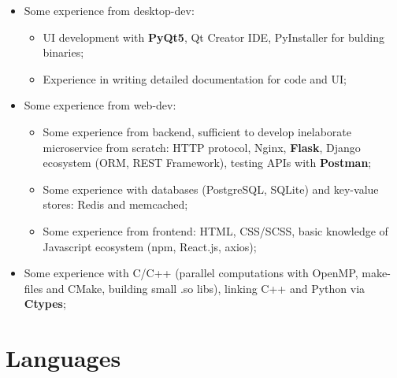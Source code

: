 \documentclass[12pt,a4paper]{moderncv}
\begin{document}
{\begin{itemize}
\begin{itemize}
        gradient boosting with \textbf{CatBoost}; experience with Torch framework; \newline
        \item Advanced work with \textbf{LaTeX} for scientific texts and presentations; \newline
    \end{itemize} 
 \item Some experience from desktop-dev:\newline
    \begin{itemize}
        \item UI development with \textbf{PyQt5}, Qt Creator IDE, PyInstaller for bulding binaries; \newline
        \item Experience in writing detailed documentation for code and UI; \newline
    \end{itemize}
 \item Some experience from web-dev: \newline
    \begin{itemize}
        \item Some experience from backend, sufficient to develop inelaborate microservice from scratch: 
          HTTP protocol, Nginx, \textbf{Flask}, Django ecosystem (ORM, REST Framework), testing APIs with \textbf{Postman};\newline
        \item Some experience with databases (PostgreSQL, SQLite) and key-value stores: Redis and memcached;\newline
        \item Some experience from frontend: 
          HTML, CSS/SCSS, basic knowledge of Javascript ecosystem (npm, React.js, axios); \newline
    \end{itemize}
 \item Some experience with C/C++ (parallel computations with OpenMP, make-files and CMake, building small .so libs), linking C++ and Python via \textbf{Ctypes}; \newline \newline
\end{itemize}
}{}{}{}{}
\section{Languages}
\end{document}
